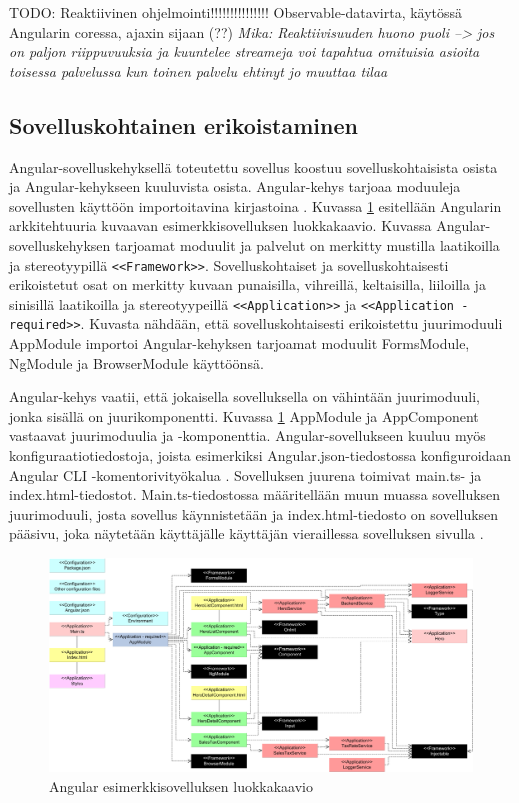 \documentclass[finnish]{tktltiki2}
\theoremstyle{definition}
\theoremstyle{remark}
\numberwithin{figure}{section}
\begin{document}
TODO: Reaktiivinen ohjelmointi!!!!!!!!!!!!!!! Observable-datavirta, käytössä Angularin coressa, ajaxin sijaan (??) \textit{Mika: Reaktiivisuuden huono puoli --> jos on paljon riippuvuuksia ja kuuntelee streameja voi tapahtua omituisia asioita toisessa palvelussa kun toinen palvelu ehtinyt jo muuttaa tilaa}

\subsection{Sovelluskohtainen erikoistaminen}

Angular-sovelluskehyksellä toteutettu sovellus koostuu sovelluskohtaisista osista ja Angular-kehykseen kuuluvista osista. Angular-kehys tarjoaa moduuleja sovellusten käyttöön importoitavina kirjastoina \cite{NgModules}. Kuvassa \ref{fig:UMLDiagramExampleApp} esitellään Angularin arkkitehtuuria kuvaavan esimerkkisovelluksen \cite{ExampleApplication} luokkakaavio. Kuvassa Angular-sovelluskehyksen tarjoamat moduulit ja palvelut on merkitty mustilla laatikoilla ja stereotyypillä \texttt{<<Framework>>}. Sovelluskohtaiset ja sovelluskohtaisesti erikoistetut osat on merkitty kuvaan punaisilla, vihreillä, keltaisilla, liiloilla ja sinisillä laatikoilla ja stereotyypeillä \texttt{<<Application>>} ja \texttt{<<Application - required>>}. Kuvasta nähdään, että sovelluskohtaisesti erikoistettu juurimoduuli AppModule importoi Angular-kehyksen tarjoamat moduulit FormsModule, NgModule ja BrowserModule käyttöönsä.

Angular-kehys vaatii, että jokaisella sovelluksella on vähintään juurimoduuli, jonka sisällä on juurikomponentti. Kuvassa \ref{fig:UMLDiagramExampleApp} AppModule ja AppComponent vastaavat juurimoduulia ja -komponenttia. Angular-sovellukseen kuuluu myös konfiguraatiotiedostoja, joista esimerkiksi Angular.json-tiedostossa konfiguroidaan Angular CLI -komentorivityökalua \cite{QuickStart}. Sovelluksen juurena toimivat main.ts- ja index.html-tiedostot. Main.ts-tiedostossa määritellään muun muassa sovelluksen juurimoduuli, josta sovellus käynnistetään ja index.html-tiedosto on sovelluksen pääsivu, joka näytetään käyttäjälle käyttäjän vieraillessa sovelluksen sivulla \cite{QuickStart}.

\begin{figure}[H]
  \centering
  \includegraphics[width=14cm]{images/UMLDiagramExampleApp.png}
  \caption{Angular esimerkkisovelluksen luokkakaavio}
  \label{fig:UMLDiagramExampleApp}
\end{figure}
\end{document}
